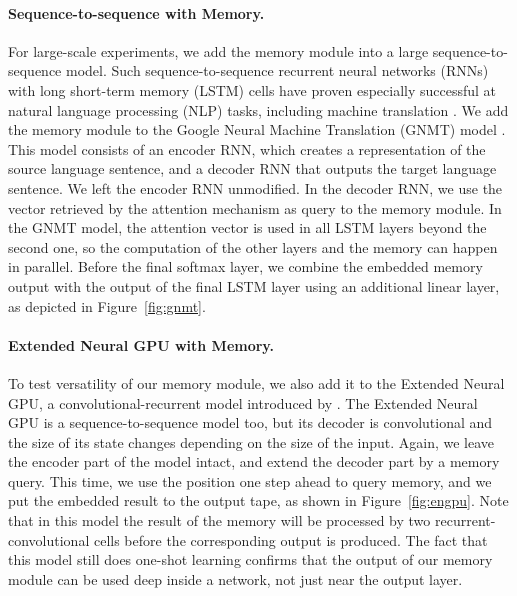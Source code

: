 \documentclass{article} \usepackage{iclr2017_conference,times}
\begin{document}
\paragraph{Sequence-to-sequence with Memory.}
For large-scale experiments, we add the memory module into a large
sequence-to-sequence model. Such sequence-to-sequence recurrent neural
networks (RNNs) with long short-term memory (LSTM) cells \citep{hochreiter1997}
have proven especially successful at natural language processing (NLP) tasks,
including machine translation \citep{sutskever14,bahdanau2014neural,cho2014learning}.
We add the memory module to the Google Neural Machine Translation (GNMT) model 
\citep{gnmt}. This model consists of an encoder RNN, which creates a representation
of the source language sentence, and a decoder RNN that outputs the target language
sentence. We left the encoder RNN unmodified. In the decoder RNN, we use the vector
retrieved by the attention mechanism as query to the memory module.
In the GNMT model, the attention vector is used in all LSTM layers beyond the second one,
so the computation of the other layers and the memory can happen in parallel.
Before the final softmax layer, we combine the embedded memory output with
the output of the final LSTM layer using an additional linear layer,
as depicted in Figure~\ref{fig:gnmt}.

\paragraph{Extended Neural GPU with Memory.}
To test versatility of our memory module, we also add it to the Extended Neural GPU,
a convolutional-recurrent model introduced by \cite{engpu}. The Extended Neural GPU
is a sequence-to-sequence model too, but its decoder is convolutional and the size
of its state changes depending on the size of the input. Again, we leave the encoder
part of the model intact, and extend the decoder part by a memory query.
This time, we use the position one step ahead to query memory, and we put
the embedded result to the output tape, as shown in Figure~\ref{fig:engpu}.
Note that in this model the result of the memory will be processed by two
recurrent-convolutional cells before the corresponding output is produced.
The fact that this model still does one-shot learning confirms that the output
of our memory module can be used deep inside a network, not just near the output layer.
\end{document}
